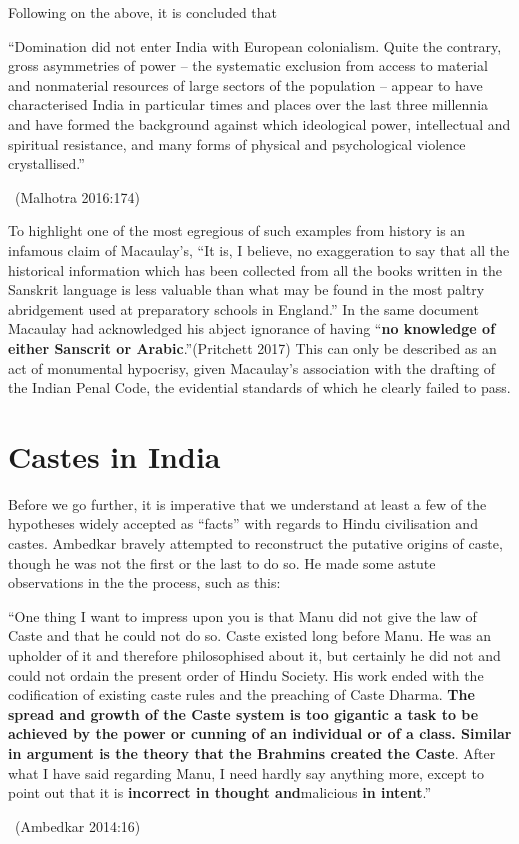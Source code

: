 Following on the above, it is concluded that

\begin{myquote}
“Domination did not enter India with European colonialism. Quite the contrary, gross asymmetries of power – the systematic exclusion from access to material and nonmaterial resources of large sectors of the population – appear to have characterised India in particular times and places over the last three millennia and have formed the background against which ideological power, intellectual and spiritual resistance, and many forms of physical and psychological violence crystallised.” 

~\hfill (Malhotra 2016:174)
\end{myquote}

To highlight one of the most egregious of such examples from history is an infamous claim of Macaulay’s, “It is, I believe, no exaggeration to say that all the historical information which has been collected from all the books written in the Sanskrit language is less valuable than what may be found in the most paltry abridgement used at preparatory schools in England.” In the same document Macaulay had acknowledged his abject ignorance of having “\textbf{no knowledge of either Sanscrit or Arabic}.”(Pritchett 2017) This can only be described as an act of monumental hypocrisy, given Macaulay's association with the drafting of the Indian Penal Code, the evidential standards of which he clearly failed to pass.


\section*{Castes in India}

Before we go further, it is imperative that we understand at least a few of the hypotheses widely accepted as “facts” with regards to Hindu civilisation and castes. Ambedkar bravely attempted to reconstruct the putative origins of caste, though he was not the first or the last to do so. He made some astute observations in the the process, such as this:

\begin{myquote}
“One thing I want to impress upon you is that Manu did not give the law of Caste and that he could not do so. Caste existed long before Manu. He was an upholder of it and therefore philosophised about it, but certainly he did not and could not ordain the present order of Hindu Society. His work ended with the codification of existing caste rules and the preaching of Caste Dharma. \textbf{The spread and growth of the Caste system is too gigantic a task to be achieved by the power or cunning of an individual or of a class. Similar in argument is the theory that the Brahmins created the Caste}. After what I have said regarding Manu, I need hardly say anything more, except to point out that it is \textbf{incorrect in thought and}malicious \textbf{in intent}.” 

~\hfill (Ambedkar 2014:16)
\end{myquote}

